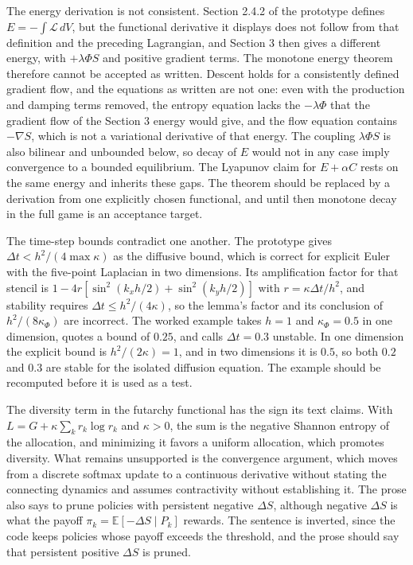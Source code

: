\documentclass[11pt]{article}
\begin{document}
The energy derivation is not consistent. Section 2.4.2 of the prototype defines $E=-\int\mathcal{L}\,dV$, but the functional derivative it displays does not follow from that definition and the preceding Lagrangian, and Section 3 then gives a different energy, with $+\lambda\Phi S$ and positive gradient terms. The monotone energy theorem therefore cannot be accepted as written. Descent holds for a consistently defined gradient flow, and the equations as written are not one: even with the production and damping terms removed, the entropy equation lacks the $-\lambda\Phi$ that the gradient flow of the Section 3 energy would give, and the flow equation contains $-\nabla S$, which is not a variational derivative of that energy. The coupling $\lambda\Phi S$ is also bilinear and unbounded below, so decay of $E$ would not in any case imply convergence to a bounded equilibrium. The Lyapunov claim for $E+\alpha C$ rests on the same energy and inherits these gaps. The theorem should be replaced by a derivation from one explicitly chosen functional, and until then monotone decay in the full game is an acceptance target.

The time-step bounds contradict one another. The prototype gives $\Delta t<h^2/(4\max\kappa)$ as the diffusive bound, which is correct for explicit Euler with the five-point Laplacian in two dimensions. Its amplification factor for that stencil is $1-4r[\sin^2(k_xh/2)+\sin^2(k_yh/2)]$ with $r=\kappa\Delta t/h^2$, and stability requires $\Delta t\le h^2/(4\kappa)$, so the lemma's factor and its conclusion of $h^2/(8\kappa_\Phi)$ are incorrect. The worked example takes $h=1$ and $\kappa_\Phi=0.5$ in one dimension, quotes a bound of $0.25$, and calls $\Delta t=0.3$ unstable. In one dimension the explicit bound is $h^2/(2\kappa)=1$, and in two dimensions it is $0.5$, so both $0.2$ and $0.3$ are stable for the isolated diffusion equation. The example should be recomputed before it is used as a test.

The diversity term in the futarchy functional has the sign its text claims. With $L=G+\kappa\sum_kr_k\log r_k$ and $\kappa>0$, the sum is the negative Shannon entropy of the allocation, and minimizing it favors a uniform allocation, which promotes diversity. What remains unsupported is the convergence argument, which moves from a discrete softmax update to a continuous derivative without stating the connecting dynamics and assumes contractivity without establishing it. The prose also says to prune policies with persistent negative $\Delta S$, although negative $\Delta S$ is what the payoff $\pi_k=\mathbb{E}[-\Delta S\mid P_k]$ rewards. The sentence is inverted, since the code keeps policies whose payoff exceeds the threshold, and the prose should say that persistent positive $\Delta S$ is pruned.
\end{document}
